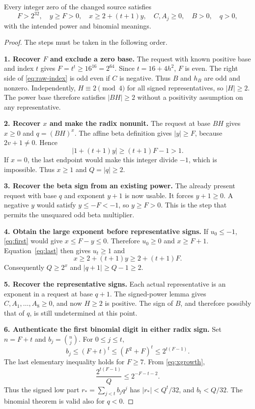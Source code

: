 \begin{proposition}\label{prop:bootstrap}
Every integer zero of the changed source satisfies
\[
 F>2^{32},\quad y\ge F>0,\quad x\ge2+(t+1)y,
 \quad C,A_j\ge0,\quad B>0,\quad q>0,
\]
with the intended power and binomial meanings.
\end{proposition}
\begin{proof}
The steps must be taken in the following order.

\textbf{1. Recover $F$ and exclude a zero base.}
The request with known positive base and index $t$ gives
$F=t^t\ge16^{16}=2^{64}$. Since $t=16+4h^2$, $F$ is even.
The right side of \eqref{eq:raw-index} is odd even if $C$ is negative.
Thus $B$ and $h_B$ are odd and nonzero. Independently,
$H\equiv2\pmod4$ for all signed representatives, so $|H|\ge2$.
The power base therefore satisfies $|BH|\ge2$ without a positivity
assumption on any representative.

\textbf{2. Recover $x$ and make the radix nonunit.}
The request at base $BH$ gives $x\ge0$ and $q=(BH)^x$.
The affine beta definition gives $|y|\ge F$, because $2v+1\ne0$.
Hence
\[
 |1+(t+1)y|\ge(t+1)F-1>1.
\]
If $x=0$, the last endpoint would make this integer divide $-1$,
which is impossible. Thus $x\ge1$ and $Q=|q|\ge2$.

\textbf{3. Recover the beta sign from an existing power.}
The already present request with base $q$ and exponent $y+1$ is now
usable. It forces $y+1\ge0$. A negative $y$ would satisfy
$y\le-F<-1$, so $y\ge F>0$. This is the step that permits the
unsquared odd beta multiplier.

\textbf{4. Obtain the large exponent before representative signs.}
If $u_0\le-1$, \eqref{eq:first} would give
$x\le F-y\le0$. Therefore $u_0\ge0$ and $x\ge F+1$.
Equation~\eqref{eq:last} then gives $u_t\ge1$ and
\begin{equation}\label{eq:xgrowth}
 x\ge2+(t+1)y\ge2+(t+1)F.
\end{equation}
Consequently $Q\ge2^x$ and $|q+1|\ge Q-1\ge2$.

\textbf{5. Recover the representative signs.}
Each actual representative is an exponent in a request at base $q+1$.
The signed-power lemma gives $C,A_1,\ldots,A_8\ge0$, and now $H\ge2$
is positive. The sign of $B$, and therefore possibly that of $q$, is
still undetermined at this point.

\textbf{6. Authenticate the first binomial digit in either radix sign.}
Set $n=F+t$ and $b_j=\binom{n}{j}$. For $0\le j\le t$,
\[
 b_j\le(F+t)^t\le(F^2+F)^t\le2^{t(F-1)}.
\]
The last elementary inequality holds for $F\ge7$. From
\eqref{eq:xgrowth},
\[
 \frac{2^{t(F-1)}}{Q}\le2^{-F-t-2}.
\]
Thus the signed low part
$r_* =\sum_{j<t}b_jq^j$ has $|r_*|<Q^t/32$, and $b_t<Q/32$.
The binomial theorem is valid also for $q<0$.


\end{proof}
